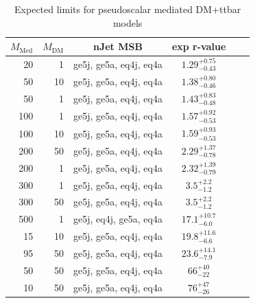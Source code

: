 \begin{table}
  \centering
  \begin{tabular}{rrcccc}
    \hline\hline
    $M_{\text{Med}}$ & $M_{\text{DM}}$ & nJet MSB & exp r-value\\
    \hline
       20 &   1 & ge5j, ge5a, eq4j, eq4a & $1.29_{-0.43}^{+0.75}$ \\ %
       50 &  10 & ge5j, ge5a, eq4j, eq4a & $1.38_{-0.46}^{+0.80}$ \\ %
       50 &   1 & ge5j, ge5a, eq4j, eq4a & $1.43_{-0.48}^{+0.83}$ \\ %
      100 &   1 & ge5j, ge5a, eq4j, eq4a & $1.57_{-0.53}^{+0.92}$ \\ %
      100 &  10 & ge5j, ge5a, eq4j, eq4a & $1.59_{-0.53}^{+0.93}$ \\ %
      200 &  50 & ge5j, ge5a, eq4j, eq4a & $2.29_{-0.78}^{+1.37}$ \\ %
      200 &   1 & ge5j, ge5a, eq4j, eq4a & $2.32_{-0.79}^{+1.39}$ \\ %
      300 &   1 & ge5j, ge5a, eq4j, eq4a & $3.5_{-1.2}^{+2.2}$    \\ %
      300 &  50 & ge5j, ge5a, eq4j, eq4a & $3.5_{-1.2}^{+2.2}$    \\ %
      500 &   1 & ge5j, eq4j, ge5a, eq4a & $17.1_{-6.0}^{+10.7}$  \\ %
       15 &  10 & ge5j, ge5a, eq4j, eq4a & $19.8_{-6.6}^{+11.6}$  \\ %
       95 &  50 & ge5j, ge5a, eq4j, eq4a & $23.6_{-7.9}^{+14.1}$  \\ %
       50 &  50 & ge5j, ge5a, eq4j, eq4a & $66_{-22}^{+40}$       \\ %
       10 &  50 & ge5j, ge5a, eq4j, eq4a & $76_{-26}^{+47}$       \\ %
    \hline\hline
  \end{tabular}
  \caption{Expected limits for pseudoscalar mediated DM+ttbar models}
  \label{tab:DMttS_exp}
\end{table}

